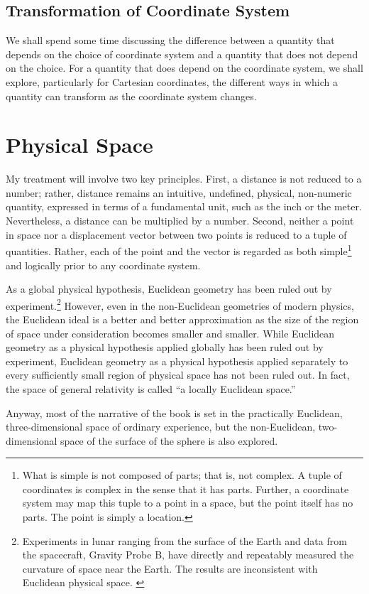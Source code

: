 \subsection{Transformation of Coordinate System}

We shall spend some time discussing the difference between a quantity that
depends on the choice of coordinate system and a quantity that does not depend
on the choice.  For a quantity that does depend on the coordinate system, we
shall explore, particularly for Cartesian coordinates, the different ways in
which a quantity can transform as the coordinate system changes.

\section{Physical Space}

My treatment will involve two key principles.  First, a distance is not reduced
to a number; rather, distance remains an intuitive, undefined, physical,
non-numeric quantity, expressed in terms of a fundamental unit, such as the
inch or the meter.  Nevertheless, a distance can be multiplied by a number.
Second, neither a point in space nor a displacement vector between two points
is reduced to a tuple of quantities.  Rather, each of the point and the vector
is regarded as both simple\footnote{%
   What is simple is not composed of parts; that is, not complex.  A tuple of
   coordinates is complex in the sense that it has parts.  Further, a
   coordinate system may map this tuple to a point in a space, but the point
   itself has no parts.  The point is simply a location.%
}
and logically prior to any coordinate system.

As a global physical hypothesis, Euclidean geometry has been ruled out by
experiment.\footnote{%
   Experiments in lunar ranging from the surface of the Earth and data from the
   spacecraft, Gravity Probe B, have directly and repeatably measured the
   curvature of space near the Earth. The results are inconsistent with
   Euclidean physical space.  \citep{gpb-2011, miller-geodetic}
}
However, even in the non-Euclidean geometries of modern physics, the Euclidean
ideal is a better and better approximation as the size of the region of space
under consideration becomes smaller and smaller.  While Euclidean geometry as a
physical hypothesis applied globally has been ruled out by experiment,
Euclidean geometry as a physical hypothesis applied separately to every
sufficiently small region of physical space has not been ruled out.  In fact,
the space of general relativity is called ``a locally Euclidean space.''

Anyway, most of the narrative of the book is set in the practically Euclidean,
three-dimensional space of ordinary experience, but the non-Euclidean,
two-dimensional space of the surface of the sphere is also explored.


